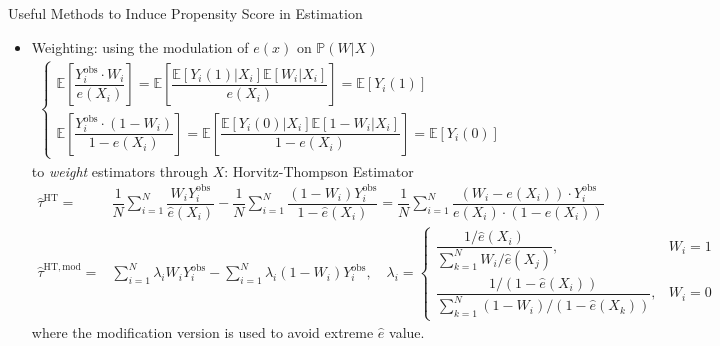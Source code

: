 \begin{point}
    Useful Methods to Induce Propensity Score in Estimation
\end{point}
\begin{itemize}[topsep=2pt,itemsep=0pt]
    \item Weighting: using the modulation of $ e(x) $ on $ \mathbb{P}\left( W|X \right)  $
    \begin{align*}
        \begin{cases}
            \mathbb{E}\left[ \dfrac{Y_i^\mathrm{obs}\cdot W_i }{e(X_i)} \right]=\mathbb{E}\left[ \dfrac{\mathbb{E}\left[ Y_i(1)|X_i \right]\mathbb{E}\left[ W_i|X_i \right]  }{e(X_i)} \right]=\mathbb{E}\left[ Y_i(1) \right]\\
            \mathbb{E}\left[ \dfrac{Y_i^\mathrm{obs}\cdot (1-W_i) }{1-e(X_i)} \right]=\mathbb{E}\left[ \dfrac{\mathbb{E}\left[ Y_i(0)|X_i \right]\mathbb{E}\left[ 1-W_i|X_i \right]  }{1-e(X_i)} \right]=\mathbb{E}\left[ Y_i(0) \right]
        \end{cases} 
    \end{align*}
    to \textit{weight} estimators through $ X $: Horvitz-Thompson Estimator 
    \begin{align*}
        \hat{\tau}^\mathrm{HT} = & \dfrac{1}{N}\sum_{i=1}^N\dfrac{W_iY^\mathrm{obs}_i }{\hat{e}(X_i)}-\dfrac{1}{N}\sum_{i=1}^N\dfrac{(1-W_i)Y^\mathrm{obs}_i }{1-\hat{e}(X_i)}=\dfrac{1}{N}\sum_{i=1}^N\dfrac{(W_i-e(X_i))\cdot Y^\mathrm{obs}_i }{e(X_i)\cdot (1-e(X_i))} \\
        \hat{\tau}^\mathrm{HT,mod} = & \sum_{i=1}^N \lambda _iW_iY^\mathrm{obs}_i-\sum_{i=1}^N\lambda _i(1-W_i)Y^\mathrm{obs}_i ,\quad \lambda _i=\begin{cases}
            \dfrac{1/\hat{e}(X_i)}{\sum_{k=1}^NW_i /\hat{e}(X_j)},&W_i=1\\
            \dfrac{1/(1-\hat{e}(X_i))}{\sum_{k=1}^N  (1-W_i)/(1-\hat{e}(X_k))},&W_i=0
        \end{cases}  
    \end{align*}
    where the modification version is used to avoid extreme $ \hat{e} $ value.


\end{itemize}

